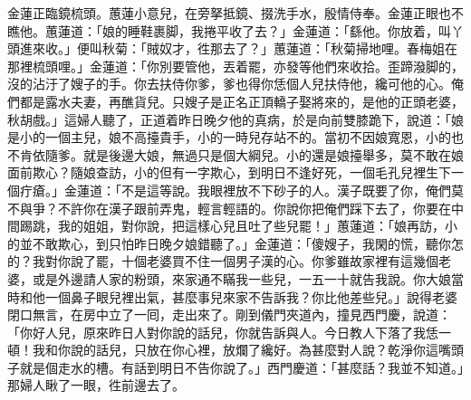 金蓮正臨鏡梳頭。蕙蓮小意兒，在旁拏抵鏡、掇洗手水，殷情侍奉。金蓮正眼也不瞧他。蕙蓮道：「娘的睡鞋裹脚，我捲平收了去？」金蓮道：「繇他。你放着，叫丫頭進來收。」便叫秋菊：「賊奴才，徃那去了？」蕙蓮道：「秋菊掃地哩。春梅姐在那裡梳頭哩。」金蓮道：「你別要管他，丟着罷，亦發等他們來收拾。歪蹄潑脚的，沒的沾汙了嫂子的手。你去扶侍你爹，爹也得你恁個人兒扶侍他，纔可他的心。俺們都是露水夫妻，再醮貨兒。只嫂子是正名正頂轎子娶將來的，是他的正頭老婆，秋胡戲。」這婦人聽了，正道着昨日晚夕他的真病，於是向前雙膝跪下，說道：「娘是小的一個主兒，娘不高擡貴手，小的一時兒存站不的。當初不因娘寬恩，小的也不肯依隨爹。就是後邊大娘，無過只是個大綱兒。小的還是娘擡舉多，莫不敢在娘面前欺心？隨娘查訪，小的但有一字欺心，到明日不逢好死，一個毛孔兒裡生下一個疔瘡。」{}金蓮道：「不是這等說。我眼裡放不下砂子的人。漢子既要了你，俺們莫不與爭？不許你在漢子跟前弄鬼，輕言輕語的。你說你把俺們踩下去了，你要在中間踢跳，我的姐姐，對你說，把這樣心兒且吐了些兒罷！」蕙蓮道：「娘再訪，小的並不敢欺心，到只怕昨日晚夕娘錯聽了。」金蓮道：「傻嫂子，我閑的慌，聽你怎的？我對你說了罷，十個老婆買不住一個男子漢的心。你爹雖故家裡有這幾個老婆，或是外邊請人家的粉頭，來家通不瞞我一些兒，一五一十就告我說。{}你大娘當時和他一個鼻子眼兒裡出氣，甚麼事兒來家不告訴我？你比他差些兒。」說得老婆閉口無言，在房中立了一囘，走出來了。剛到儀門夾道內，撞見西門慶，說道：「你好人兒，原來昨日人對你說的話兒，你就告訴與人。{}今日教人下落了我恁一頓！我和你說的話兒，只放在你心裡，放爛了纔好。為甚麼對人說？乾淨你這嘴頭子就是個走水的槽。有話到明日不告你說了。」西門慶道：「甚麼話？我並不知道。」{}那婦人瞅了一眼，徃前邊去了。

